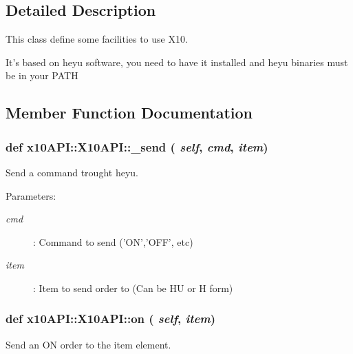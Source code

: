 \subsection{Detailed Description}
This class define some facilities to use X10. 

It's based on heyu software, you need to have it installed and heyu binaries must be in your PATH 

\subsection{Member Function Documentation}
\hypertarget{classx10API_1_1X10API_268f590bc14835490b1ea823c86e4dcb}{
\subsubsection[\_\-send]{\setlength{\rightskip}{0pt plus 5cm}def x10API::X10API::\_\-send ( {\em self}, \/   {\em cmd}, \/   {\em item})}}
\label{classx10API_1_1X10API_268f590bc14835490b1ea823c86e4dcb}


Send a command trought heyu. 

\begin{Desc}
\item[Parameters:]
\begin{description}
\item[{\em cmd}]: Command to send ('ON','OFF', etc) \item[{\em item}]: Item to send order to (Can be HU or H form) \end{description}
\end{Desc}
\hypertarget{classx10API_1_1X10API_b23095bb54aa45e75857beaa59a7deed}{
\subsubsection[on]{\setlength{\rightskip}{0pt plus 5cm}def x10API::X10API::on ( {\em self}, \/   {\em item})}}
\label{classx10API_1_1X10API_b23095bb54aa45e75857beaa59a7deed}


Send an ON order to the item element. 

